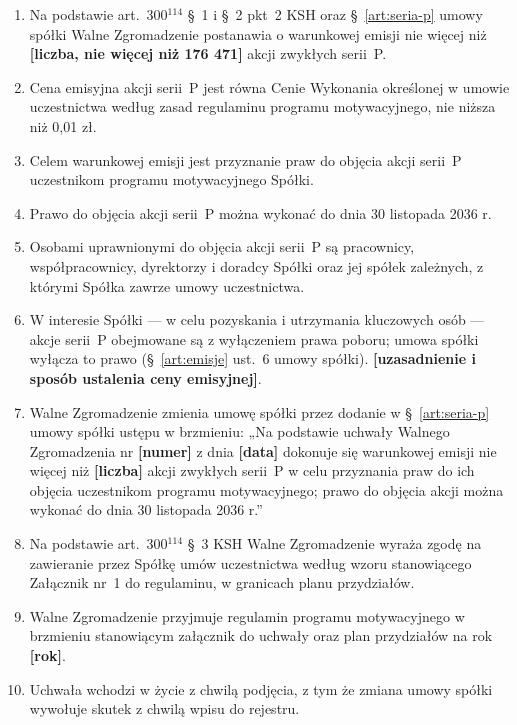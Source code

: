\documentclass[11pt,a4paper]{report}
\newcommand{\field}[1]{\textbf{[#1]}}
\newcommand{\US}[1]{§~#1 umowy spółki}
\begin{document}
\begin{enumerate}
  \item Na podstawie art.~300$^{114}$ §~1 i §~2 pkt~2 KSH oraz \US{\ref{art:seria-p}} Walne Zgromadzenie postanawia o warunkowej emisji nie więcej niż \field{liczba, nie więcej niż 176 471} akcji zwykłych serii~P.
  \item Cena emisyjna akcji serii~P jest równa Cenie Wykonania określonej w umowie uczestnictwa według zasad regulaminu programu motywacyjnego, nie niższa niż 0,01 zł.
  \item Celem warunkowej emisji jest przyznanie praw do objęcia akcji serii~P uczestnikom programu motywacyjnego Spółki.
  \item Prawo do objęcia akcji serii~P można wykonać do dnia 30 listopada 2036 r.
  \item Osobami uprawnionymi do objęcia akcji serii~P są pracownicy, współpracownicy, dyrektorzy i doradcy Spółki oraz jej spółek zależnych, z którymi Spółka zawrze umowy uczestnictwa.
  \item W interesie Spółki --- w celu pozyskania i utrzymania kluczowych osób --- akcje serii~P obejmowane są z wyłączeniem prawa poboru; umowa spółki wyłącza to prawo (\US{\ref{art:emisje} ust.~6}). \field{uzasadnienie i sposób ustalenia ceny emisyjnej}.
  \item Walne Zgromadzenie zmienia umowę spółki przez dodanie w \US{\ref{art:seria-p}} ustępu w brzmieniu: „Na podstawie uchwały Walnego Zgromadzenia nr \field{numer} z dnia \field{data} dokonuje się warunkowej emisji nie więcej niż \field{liczba} akcji zwykłych serii~P w celu przyznania praw do ich objęcia uczestnikom programu motywacyjnego; prawo do objęcia akcji można wykonać do dnia 30 listopada 2036 r.”
  \item Na podstawie art.~300$^{114}$ §~3 KSH Walne Zgromadzenie wyraża zgodę na zawieranie przez Spółkę umów uczestnictwa według wzoru stanowiącego Załącznik nr~1 do regulaminu, w granicach planu przydziałów.
  \item Walne Zgromadzenie przyjmuje regulamin programu motywacyjnego w brzmieniu stanowiącym załącznik do uchwały oraz plan przydziałów na rok \field{rok}.
  \item Uchwała wchodzi w życie z chwilą podjęcia, z tym że zmiana umowy spółki wywołuje skutek z chwilą wpisu do rejestru.
\end{enumerate}
\end{document}
